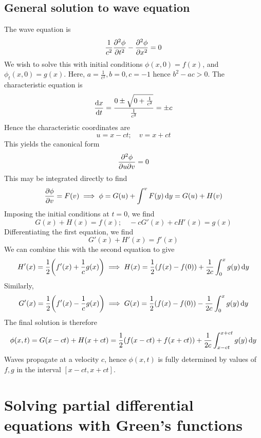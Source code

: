 \documentclass[a4paper]{article}
\begin{document}
\subsection{General solution to wave equation}
The wave equation is
\[
	\frac{1}{c^2} \pdv[2]{\phi}{t} - \pdv[2]{\phi}{x} = 0
\]
We wish to solve this with initial conditions \( \phi(x,0) = f(x) \), and \( \phi_t(x,0) = g(x) \).
Here, \( a = \frac{1}{c^2}, b = 0, c = -1 \) hence \( b^2 - ac > 0 \).
The characteristic equation is
\[
	\dv{x}{t} = \frac{0 \pm \sqrt{0 + \frac{1}{c^2}}}{\frac{1}{c^2}} = \pm c
\]
Hence the characteristic coordinates are
\[
	u = x - ct;\quad v = x + ct
\]
This yields the canonical form
\[
	\pdv{\phi}{u}{v} = 0
\]
This may be integrated directly to find
\[
	\pdv{\phi}{v} = F(v) \implies \phi = G(u) + \int^v F(y) \dd{y} = G(u) + H(v)
\]
Imposing the initial conditions at \( t = 0 \), we find
\[
	G(x) + H(x) = f(x);\quad -cG'(x) + cH'(x) = g(x)
\]
Differentiating the first equation, we find
\[
	G'(x) + H'(x) = f'(x)
\]
We can combine this with the second equation to give
\[
	H'(x) = \frac{1}{2} \qty(f'(x) + \frac{1}{c}g(x)) \implies H(x) = \frac{1}{2} \qty(f(x) - f(0)) + \frac{1}{2c}\int_0^x g(y) \dd{y}
\]
Similarly,
\[
	G'(x) = \frac{1}{2} \qty(f'(x) - \frac{1}{c}g(x)) \implies G(x) = \frac{1}{2} \qty(f(x) - f(0)) - \frac{1}{2c}\int_0^x g(y) \dd{y}
\]
The final solution is therefore
\[
	\phi(x,t) = G(x-ct) + H(x+ct) = \frac{1}{2}\qty(f(x-ct) + f(x+ct)) + \frac{1}{2c} \int_{x-ct}^{x+ct} g(y) \dd{y}
\]
Waves propagate at a velocity \( c \), hence \( \phi(x,t) \) is fully determined by values of \( f, g \) in the interval \( [x-ct, x+ct] \).

\section{Solving partial differential equations with Green's functions}
\end{document}
